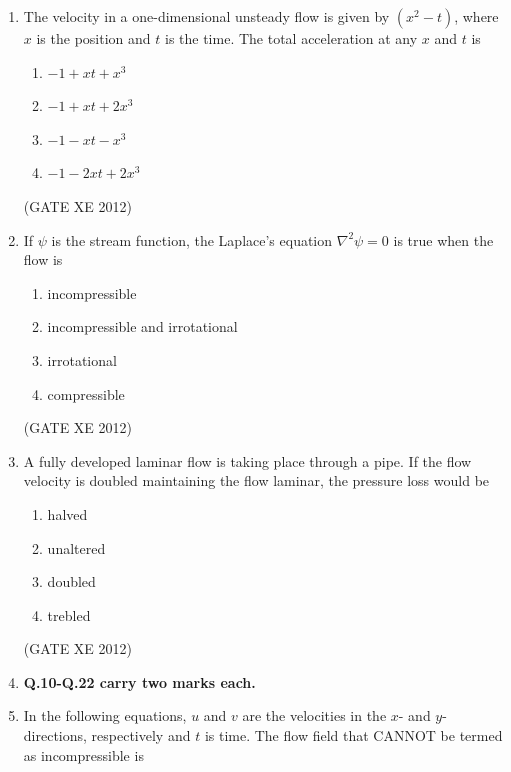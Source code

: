 \documentclass[12pt]{article}
\begin{document}
\begin{enumerate}
(GATE XE 2012)

\item The velocity in a one-dimensional unsteady flow is given by $(x^{2} - t)$, where $x$ is the position and $t$ is the time. The total acceleration at any $x$ and $t$ is
\begin{multicols}{4}
\begin{enumerate}
\item $-1 + x t + x^{3}$
\item $-1 + x t + 2x^{3}$
\item $-1 - x t - x^{3}$
\item $-1 - 2x t + 2x^{3}$
\end{enumerate}
\end{multicols}

(GATE XE 2012)

\item If $\psi$ is the stream function, the Laplace’s equation $\nabla^{2}\psi = 0$ is true when the flow is
\begin{multicols}{2}
\begin{enumerate}
\item incompressible
\item incompressible and irrotational
\item irrotational
\item compressible
\end{enumerate}
\end{multicols}

(GATE XE 2012)

\item A fully developed laminar flow is taking place through a pipe. If the flow velocity is doubled maintaining the flow laminar, the pressure loss would be
\begin{multicols}{4}
\begin{enumerate}
\item halved
\item unaltered
\item doubled
\item trebled
\end{enumerate}
\end{multicols}

(GATE XE 2012)

\item[] \textbf{Q.10-Q.22 carry two marks each.}

\item In the following equations, $u$ and $v$ are the velocities in the $x$- and $y$- directions, respectively and $t$ is time. The flow field that CANNOT be termed as incompressible is


\end{enumerate}
\end{document}
